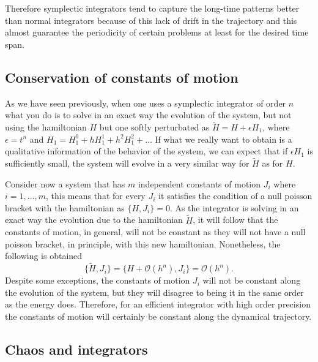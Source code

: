 Therefore symplectic integrators tend to capture the long-time patterns better than normal integrators because of this lack of drift in the trajectory and this almost guarantee the periodicity of certain problems at least for the desired time span. 

\subsection{Conservation of constants of motion}
As we have seen previously, when one uses a symplectic integrator of order $n$ what you do is to solve in an exact way the evolution of the system, but not using the hamiltonian $H$ but one softly perturbated as $\tilde{H}=H+\epsilon H_1$, where $\epsilon=t^n$ and $H_1=H_1^0+hH_1^1+h^2H_1^2+...$ If what we really want to obtain is a qualitative information of the behavior of the system, we can expect that if $\epsilon H_1$ is sufficiently small, the system will evolve in a very similar way for $\tilde{H}$ as for $H$.\par

Consider now a system that has $m$ independent constants of motion $J_i$ where $i=1,...,m$, this means that for every $J_i$ it satisfies the condition of a null poisson bracket with the hamiltonian as $\{H,J_i\}=0$. As the integrator is solving in an exact way the evolution due to the hamiltonian $\tilde{H}$, it will follow that the constants of motion, in general, will not be constant as they will not have a null poisson bracket, in principle, with this new hamiltonian. Nonetheless, the following is obtained
\begin{equation}
\{\tilde{H},J_i\}=\{H+\mathcal{O}(h^n),J_i\}=\mathcal{O}(h^n).
\end{equation}
Despite some exceptions, the constants of motion $J_i$ will not be constant along the evolution of the system, but they will disagree to being it in the same order as the energy does. Therefore, for an efficient integrator with high order precision the constants of motion will certainly be constant along the dynamical trajectory.

\subsection{Chaos and integrators}

